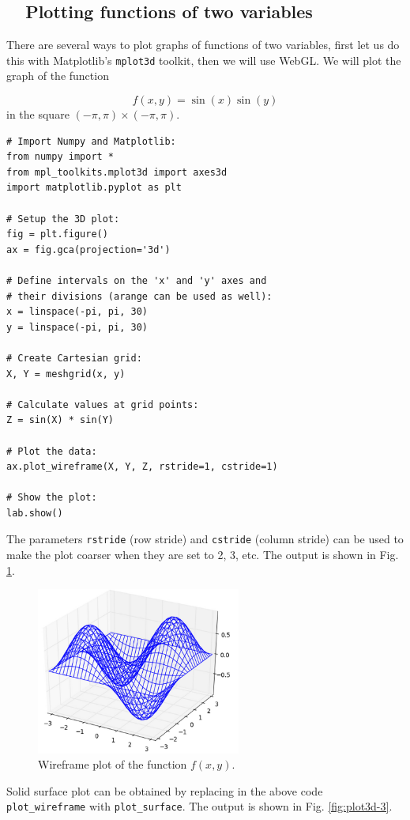 \subsection{\ \ Plotting functions of two variables}

There are several ways to plot graphs of functions of two variables, 
first let us do this with Matplotlib's {\tt mplot3d} toolkit, then we will
use WebGL. We will plot the graph of the function 

$$
  f(x, y) = \sin(x) \sin(y)
$$
in the square $(-\pi, \pi) \times (-\pi, \pi)$.

\begin{verbatim}
# Import Numpy and Matplotlib:
from numpy import *
from mpl_toolkits.mplot3d import axes3d
import matplotlib.pyplot as plt

# Setup the 3D plot:
fig = plt.figure()
ax = fig.gca(projection='3d')

# Define intervals on the 'x' and 'y' axes and 
# their divisions (arange can be used as well):
x = linspace(-pi, pi, 30)
y = linspace(-pi, pi, 30)

# Create Cartesian grid:
X, Y = meshgrid(x, y)

# Calculate values at grid points:
Z = sin(X) * sin(Y)

# Plot the data:
ax.plot_wireframe(X, Y, Z, rstride=1, cstride=1)

# Show the plot:
lab.show()
\end{verbatim}
The parameters {\tt rstride} (row stride) and {\tt cstride} (column stride)
can be used to make the plot coarser when they are set to 2, 3, etc.
The output is shown in Fig. \ref{fig:plot3d-2}.
\newpage

\begin{figure}[!ht]
\begin{center}
\includegraphics[width=0.6\textwidth]{imgp/plot3d-2.png}
\end{center}
\vspace{-4mm}
\caption{Wireframe plot of the function $f(x, y)$.}
\label{fig:plot3d-2}
\end{figure}
\noindent
Solid surface plot can be obtained by replacing in the above code 
{\tt plot\_wireframe} with {\tt plot\_surface}. 
The output is shown in Fig. \ref{fig:plot3d-3}.

